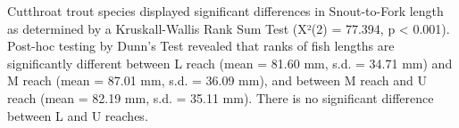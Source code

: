\documentclass[
]{article}
\newenvironment{Shaded}{\begin{snugshade}}{\end{snugshade}}
\newcommand{\AttributeTok}[1]{\textcolor[rgb]{0.13,0.29,0.53}{#1}}
\newcommand{\CommentTok}[1]{\textcolor[rgb]{0.56,0.35,0.01}{\textit{#1}}}
\newcommand{\ConstantTok}[1]{\textcolor[rgb]{0.56,0.35,0.01}{#1}}
\newcommand{\FunctionTok}[1]{\textcolor[rgb]{0.13,0.29,0.53}{\textbf{#1}}}
\newcommand{\NormalTok}[1]{#1}
\newcommand{\OtherTok}[1]{\textcolor[rgb]{0.56,0.35,0.01}{#1}}
\newcommand{\SpecialCharTok}[1]{\textcolor[rgb]{0.81,0.36,0.00}{\textbf{#1}}}
\newcommand{\StringTok}[1]{\textcolor[rgb]{0.31,0.60,0.02}{#1}}
\begin{document}
\begin{Shaded}
\end{Shaded}

Cutthroat trout species displayed significant diﬀerences in
Snout-to-Fork length as determined by a Kruskall-Wallis Rank Sum Test
(X²(2) = 77.394, p \textless{} 0.001). Post-hoc testing by Dunn's Test
revealed that ranks of fish lengths are significantly different between
L reach (mean = 81.60 mm, s.d. = 34.71 mm) and M reach (mean = 87.01 mm,
s.d. = 36.09 mm), and between M reach and U reach (mean = 82.19 mm, s.d.
= 35.11 mm). There is no significant difference between L and U reaches.
\end{document}
